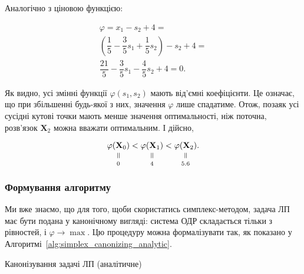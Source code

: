 \documentclass[\main/book.tex]{subfiles}
\begin{document}
Аналогічно з ціновою функцією:

\[
\begin{split}
 \varphi = x_1 - s_2 + 4 = \\
 \left( \dfrac{1}{5} - \dfrac{3}{5}s_1 + \dfrac{1}{5}s_2 \right) - s_2 + 4 = \\
 \dfrac{21}{5} - \dfrac{3}{5} s_1 - \dfrac{4}{5} s_2 + 4 = 0
 \text{.}
\end{split}
\]

Як видно, усі змінні функції $\varphi(s_1, s_2)$ мають від'ємні коефіцієнти. Це означає, що при збільшенні будь-якої з них, значення $\varphi$ лише спадатиме. Отож, позаяк усі сусідні кутові точки мають менше значення оптимальності, ніж поточна, розв'язок $\mathbf{X}_2$ можна вважати оптимальним. І дійсно,

\[
 \equalto{\varphi(\mathbf{X}_0)}{0} <
 \equalto{\varphi(\mathbf{X}_1)}{4} <
 \equalto{\varphi(\mathbf{X}_2)}{5.6}
 \text{.}
\]

\subsubsection{Формування алгоритму}

Ми вже знаємо, що для того, щоби скористатись симплекс-методом, задача ЛП має бути подана у канонічному вигляді: система ОДР складається тільки з рівностей, і $\varphi \rightarrow \max$. Цю процедуру можна формалізувати так, як показано у Алгоритмі~\ref{alg:simplex_canonizing_analytic}.

\begin{algorithm}
\caption{Канонізування задачі ЛП (аналітичне)}
\label{alg:simplex_canonizing_analytic}
\begin{algorithmic}[1]
\end{algorithmic}
\end{algorithm}
\end{document}

